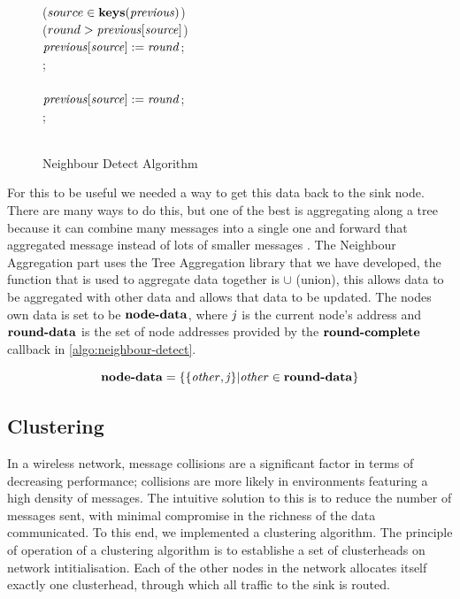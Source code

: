 \begin{figure}[H]
\begin{boxedminipage}{\linewidth}
    \null\qq\qq {} ($source \in \mbox{\textbf{keys}}(\mbox{\emph{previous}})$)  \\
    \null\qq\qq\qq {} ($round > \mbox{\emph{previous}}[\mbox{\emph{source}}]$)  \\
    \null\qq\qq\qq\qq $\mbox{\emph{previous}}[\mbox{\emph{source}}] \mathrel{:=} \mbox{\emph{round}}$; \\
    \null\qq\qq\qq {}; \\
    \null\qq\qq {} \\
    \null\qq\qq\qq $\mbox{\emph{previous}}[\mbox{\emph{source}}] \mathrel{:=} \mbox{\emph{round}}$; \\
    \null\qq\qq {}; \\~\\
  \end{boxedminipage}
  \caption{Neighbour Detect Algorithm}
  \label{algo:neighbour-detect}
\end{figure}

For this to be useful we needed a way to get this data back to the sink node. There are many ways to do this, but one of the best is aggregating along a tree because it can combine many messages into a single one and forward that aggregated message instead of lots of smaller messages \cite{?}. The Neighbour Aggregation part uses the Tree Aggregation library that we have developed, the function that is used to aggregate data together is $\cup$ (union), this allows data to be aggregated with other data and allows that data to be updated. The nodes own data is set to be $\mbox{\textbf{node-data}}$, where $\mbox{\emph{j}}$ is the current node's address and $\mbox{\textbf{round-data}}$ is the set of node addresses provided by the $\mbox{\textbf{round-complete}}$ callback in \autoref{algo:neighbour-detect}.

\begin{equation}
\mbox{\textbf{node-data}} = \{\{\mbox{\emph{other}}, \mbox{\emph{j}}\} | \mbox{\emph{other}} \in \mbox{\textbf{round-data}} \}
\end{equation}

\subsection{Clustering}

In a wireless network, message collisions are a significant factor in terms of decreasing performance; collisions are more likely in environments featuring a high density of messages. The intuitive solution to this is to reduce the number of messages sent, with minimal compromise in the richness of the data communicated. To this end, we implemented a clustering algorithm. The principle of operation of a clustering algorithm is to establishe a set of clusterheads on network intitialisation. Each of the other nodes in the network allocates itself exactly one clusterhead, through which all traffic to the sink is routed.

